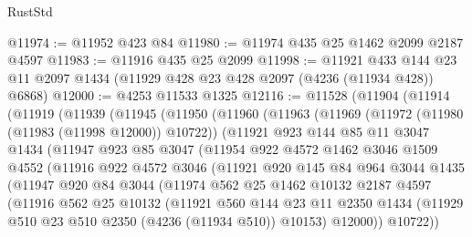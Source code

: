 \begin{lexlean}{RustStd}
\begin{coremodule}
@11974 := @11952 @423 @84
@11980 := @11974 @435 @25 @1462 @2099 @2187 @4597
@11983 := @11916 @435 @25 @2099
@11998 := @11921
    @433
    @144
    @23
    @11
    @2097
    @1434
    (@11929 @428 @23 @428 @2097 (@4236 (@11934 @428)) @6868)
@12000 := @4253 @11533 @1325
@12116 := @11528
    (@11904
      (@11914
        (@11919
          (@11939
            (@11945
              (@11950
                (@11960
                  (@11963
                    (@11969
                      (@11972 (@11980 (@11983 (@11998 @12000)) @10722))
                      (@11921
                        @923
                        @144
                        @85
                        @11
                        @3047
                        @1434
                        (@11947
                          @923
                          @85
                          @3047
                          (@11954
                            @922
                            @4572
                            @1462
                            @3046
                            @1509
                            @4552
                            (@11916
                              @922
                              @4572
                              @3046
                              (@11921
                                @920
                                @145
                                @84
                                @964
                                @3044
                                @1435
                                (@11947
                                  @920
                                  @84
                                  @3044
                                  (@11974
                                    @562
                                    @25
                                    @1462
                                    @10132
                                    @2187
                                    @4597
                                    (@11916
                                      @562
                                      @25
                                      @10132
                                      (@11921
                                        @560
                                        @144
                                        @23
                                        @11
                                        @2350
                                        @1434
                                        (@11929 @510 @23 @510 @2350 (@4236 (@11934 @510)) @10153)
                                        @12000))
                                    @10722))

\end{coremodule}
\end{lexlean}
